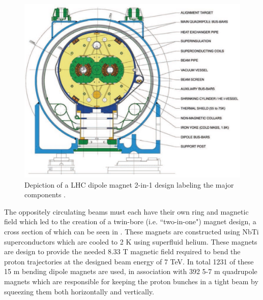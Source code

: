 \begin{figure}[!htbp] 
  \begin{center}
    \includegraphics[width=0.9\linewidth]{figures/lhc/dipole.jpg}
    \caption{ Depiction of a LHC dipole magnet 2-in-1 design labeling the major
components \cite{Dailler:842530}.} 
    \label{fig:dipole} 
  \end{center} 
\end{figure}

The oppositely circulating beams must each have their own ring and magnetic field
which led to the creation of a twin-bore (i.e. ``two-in-one") magnet design, a
cross section of which can be seen in . These magnets are constructed
using NbTi superconductors which are cooled to 2 K using superfluid helium.
These magnets are design to provide the needed 8.33 T magnetic field required
to bend the proton trajectories at the designed beam energy of 7 TeV.  In total 1231 of these 15
m bending dipole magnets are used, in association with 392 5-7 m
quadrupole magnets which are responsible for keeping the proton bunches in a
tight beam by squeezing them both horizontally and vertically.
